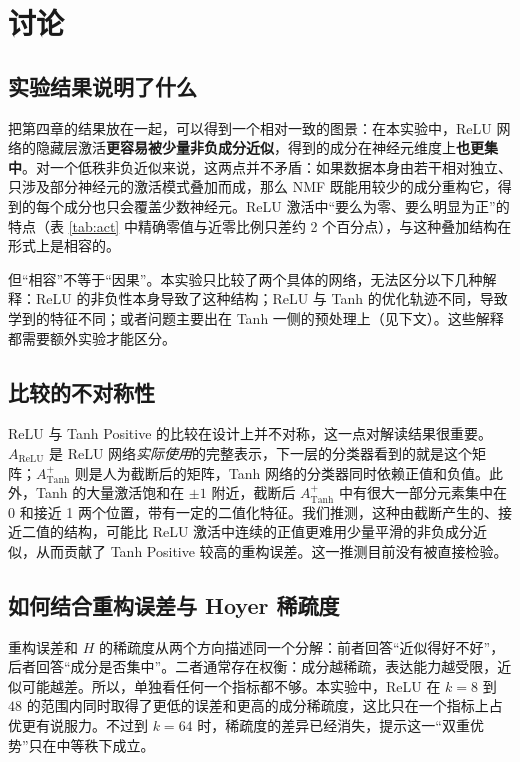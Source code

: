 \documentclass[UTF8,a4paper,11pt]{ctexart}
\newcommand{\Arelu}{A_{\mathrm{ReLU}}}
\newcommand{\Apos}{A^{+}_{\mathrm{Tanh}}}
\begin{document}
\section{讨论}

\subsection{实验结果说明了什么}

把第四章的结果放在一起，可以得到一个相对一致的图景：在本实验中，ReLU 网络的隐藏层激活\textbf{更容易被少量非负成分近似}，得到的成分在神经元维度上\textbf{也更集中}。对一个低秩非负近似来说，这两点并不矛盾：如果数据本身由若干相对独立、只涉及部分神经元的激活模式叠加而成，那么 NMF 既能用较少的成分重构它，得到的每个成分也只会覆盖少数神经元。ReLU 激活中“要么为零、要么明显为正”的特点（表 \ref{tab:act} 中精确零值与近零比例只差约 2 个百分点），与这种叠加结构在形式上是相容的。

但“相容”不等于“因果”。本实验只比较了两个具体的网络，无法区分以下几种解释：ReLU 的非负性本身导致了这种结构；ReLU 与 Tanh 的优化轨迹不同，导致学到的特征不同；或者问题主要出在 Tanh 一侧的预处理上（见下文）。这些解释都需要额外实验才能区分。

\subsection{比较的不对称性}

ReLU 与 Tanh Positive 的比较在设计上并不对称，这一点对解读结果很重要。$\Arelu$ 是 ReLU 网络\emph{实际使用}的完整表示，下一层的分类器看到的就是这个矩阵；$\Apos$ 则是人为截断后的矩阵，Tanh 网络的分类器同时依赖正值和负值。此外，Tanh 的大量激活饱和在 $\pm1$ 附近，截断后 $\Apos$ 中有很大一部分元素集中在 0 和接近 1 两个位置，带有一定的二值化特征。我们推测，这种由截断产生的、接近二值的结构，可能比 ReLU 激活中连续的正值更难用少量平滑的非负成分近似，从而贡献了 Tanh Positive 较高的重构误差。这一推测目前没有被直接检验。

\subsection{如何结合重构误差与 Hoyer 稀疏度}

重构误差和 $H$ 的稀疏度从两个方向描述同一个分解：前者回答“近似得好不好”，后者回答“成分是否集中”。二者通常存在权衡：成分越稀疏，表达能力越受限，近似可能越差。所以，单独看任何一个指标都不够。本实验中，ReLU 在 $k=8$ 到 $48$ 的范围内同时取得了更低的误差和更高的成分稀疏度，这比只在一个指标上占优更有说服力。不过到 $k=64$ 时，稀疏度的差异已经消失，提示这一“双重优势”只在中等秩下成立。
\end{document}
